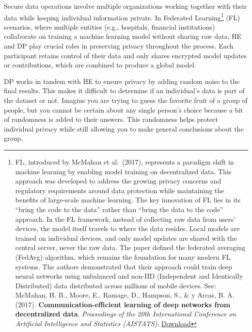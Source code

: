 \documentclass[
  letterpaper,
  DIV=11,
  numbers=noendperiod,
  oneside]{scrartcl}
\begin{document}
Secure data operations involve multiple organizations working together
with their data while keeping individual information private. In
Federated Learning\footnote{FL, introduced by McMahan et al.~(2017),
  represents a paradigm shift in machine learning by enabling model
  training on decentralized data. This approach was developed to address
  the growing privacy concerns and regulatory requirements around data
  protection while maintaining the benefits of large-scale machine
  learning. The key innovation of FL lies in its ``bring the code to the
  data'' rather than ``bring the data to the code'' approach. In the FL
  framework, instead of collecting raw data from users' devices, the
  model itself travels to where the data resides. Local models are
  trained on individual devices, and only model updates are shared with
  the central server, never the raw data. The paper defined the
  federated averaging (FedAvg) algorithm, which remains the foundation
  for many modern FL systems. The authors demonstrated that their
  approach could train deep neural networks using unbalanced and non-IID
  (Independent and Identically Distributed) data distributed across
  millions of mobile devices. See: McMahan, H. B., Moore, E., Ramage,
  D., Hampson, S., \& y Arcas, B. A. (2017).
  \textbf{Communication-efficient learning of deep networks from
  decentralized data}. \emph{Proceedings of the 20th International
  Conference on Artificial Intelligence and Statistics (AISTATS)}.
  \href{https://proceedings.mlr.press/v54/mcmahan17a.html}{Download}}
(FL) scenarios, where multiple entities (e.g., hospitals, financial
institutions) collaborate on training a machine learning model without
sharing raw data, HE and DP play crucial roles in preserving privacy
throughout the process. Each participant retains control of their data
and only shares encrypted model updates or contributions, which are
combined to produce a global model.

DP works in tandem with HE to ensure privacy by adding random noise to
the final results. This makes it difficult to determine if an
individual's data is part of the dataset or not. Imagine you are trying
to guess the favorite fruit of a group of people, but you cannot be
certain about any single person's choice because a bit of randomness is
added to their answers. This randomness helps protect individual privacy
while still allowing you to make general conclusions about the group.
\end{document}
